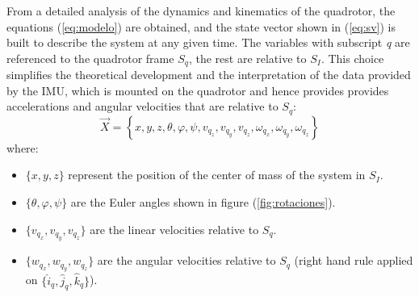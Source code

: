 \documentclass[conference]{IEEEtran}
\newcommand{\refp}[1]{(\ref{#1})}
\begin{document}
From a detailed analysis of the dynamics and kinematics of the quadrotor, the equations \refp{eq:modelo} are obtained, and the state vector shown in \refp{eq:sv} is built to describe the system at any given time. The variables with subscript \textit{q} are referenced to the quadrotor frame $S_q$, the rest are relative to $S_I$. This choice simplifies the theoretical development and the interpretation of the data provided by the IMU, which is mounted on the quadrotor and hence provides provides accelerations and angular velocities that are relative to $S_q$:
\begin{equation}
\vec{X}=\left\lbrace  x,y,z, \theta,\varphi,\psi, v_{q_z},v_{q_y},v_{q_z},\omega_{q_x},\omega_{q_y},\omega_{q_z} \right\rbrace
\label{eq:sv}
\end{equation}
where:
\begin{itemize}
\item $\lbrace x,y,z \rbrace$ represent the position of the center of mass of the system in $S_I$.
\item $\lbrace\theta,\varphi,\psi\rbrace$ are the Euler angles shown in figure \refp{fig:rotaciones}.
\item $\lbrace v_{q_x},v_{q_y},v_{q_z}\rbrace$ are the linear velocities relative to $S_q$.
\item $\lbrace w_{q_x},w_{q_y},w_{q_z}\rbrace$ are the angular velocities relative to $S_q$ (right hand rule applied on $\lbrace \hat{i}_q,\hat{j}_q,\hat{k}_q\rbrace$).
\end{itemize}
\vspace{10pt}
\end{document}
